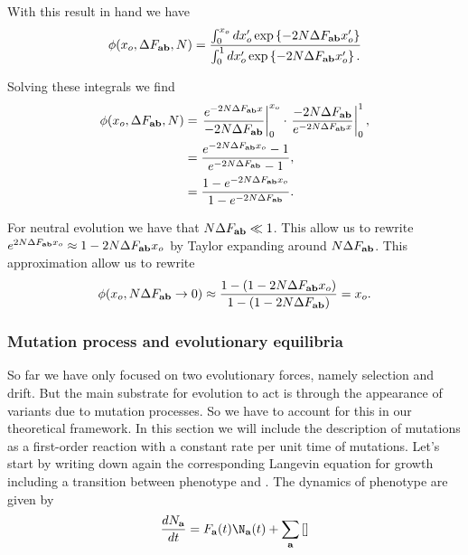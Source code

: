 With this result in hand we have
\begin{equation}
  \phi(x_o, \Delta F_{\mathbf{ab}}, N) = { \int_0^{x_o} dx_o' \exp \left\{ -2 N \Delta F_{\mathbf{ab}} x_o'  \right\}
  \over
  \int_0^1 dx_o' \exp \left\{ -2 N \Delta F_{\mathbf{ab}} x_o'  \right\}.}
\end{equation}

Solving these integrals we find
\begin{align}
\phi(x_o, \Delta F_{\mathbf{ab}}, N) &= \left. {e^{-2 N \Delta F_{\mathbf{ab}} x} \over -2 N \Delta F_{\mathbf{ab}}}\right\rvert_0^{x_o}
\cdot \left.{-2 N \Delta F_{\mathbf{ab}} \over e^{-2N \Delta F_{\mathbf{ab}} x}}\right\rvert_0^1,\\
&= {e^{-2 N \Delta F_{\mathbf{ab}} x_o} - 1 \over e^{-2 N \Delta F_{\mathbf{ab}}} - 1},\\
&= {1 - e^{-2 N \Delta F_{\mathbf{ab}} x_o} \over 1 - e^{-2 N \Delta F_{\mathbf{ab}}}}.\\
\end{align}

For neutral evolution we have that $N\Delta F_{\mathbf{ab}} \ll 1$. This allow us to rewrite
$e^{2 N \Delta F_{\mathbf{ab}} x_o} \approx 1 - 2 N \Delta F_{\mathbf{ab}} x_o$ by Taylor expanding around $N \Delta F_{\mathbf{ab}}$.
This approximation allow us to rewrite
\begin{equation}
  \phi(x_o, N\Delta F_{\mathbf{ab}} \rightarrow 0) \approx
  {1 - (1 - 2 N \Delta F_{\mathbf{ab}}x_o) \over 1 - (1 - 2 N \Delta F_{\mathbf{ab}})} = x_o.
\end{equation}

\subsubsection{Mutation process and evolutionary equilibria}

So far we have only focused on two evolutionary forces, namely selection and
drift. But the main substrate for evolution to act is through the appearance of
variants due to mutation processes. So we have to account for this in our
theoretical framework. In this section we will include the description of
mutations as a first-order reaction with a constant rate per unit time of
mutations. Let's start by writing down again the corresponding Langevin equation
for growth including a transition between phenotype  and . The
dynamics of phenotype  are given by
\begin{equation}
  \dt{N_\bb{a}} = F_\bb{a}(t) \N_\bb{a}(t) +
  \sum_\bb{a} \left[  \right]
\end{equation}

